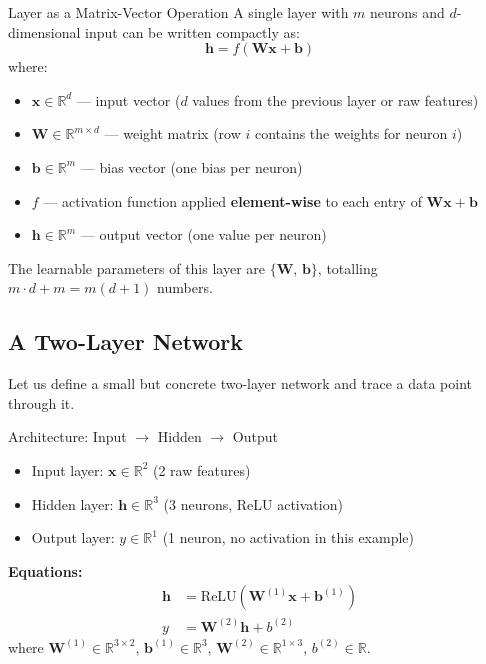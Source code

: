 \begin{conceptbox}{Layer as a Matrix-Vector Operation}
A single layer with $m$ neurons and $d$-dimensional input can be written compactly as:
\begin{equation}
    \mathbf{h} = f\!\left(\mathbf{W}\mathbf{x} + \mathbf{b}\right)
\end{equation}
where:
\begin{itemize}
    \item $\mathbf{x} \in \mathbb{R}^d$ --- input vector ($d$ values from the previous layer or raw features)
    \item $\mathbf{W} \in \mathbb{R}^{m \times d}$ --- weight matrix (row $i$ contains the weights for neuron $i$)
    \item $\mathbf{b} \in \mathbb{R}^m$ --- bias vector (one bias per neuron)
    \item $f$ --- activation function applied \textbf{element-wise} to each entry of $\mathbf{Wx}+\mathbf{b}$
    \item $\mathbf{h} \in \mathbb{R}^m$ --- output vector (one value per neuron)
\end{itemize}
The learnable parameters of this layer are $\{\mathbf{W},\, \mathbf{b}\}$, totalling $m \cdot d + m = m(d+1)$ numbers.
\end{conceptbox}

\subsection{A Two-Layer Network}

Let us define a small but concrete two-layer network and trace a data point through it.

\begin{conceptbox}{Architecture: Input $\to$ Hidden $\to$ Output}
\begin{itemize}
    \item Input layer: $\mathbf{x} \in \mathbb{R}^2$ (2 raw features)
    \item Hidden layer: $\mathbf{h} \in \mathbb{R}^3$ (3 neurons, ReLU activation)
    \item Output layer: $y \in \mathbb{R}^1$ (1 neuron, no activation in this example)
\end{itemize}
\textbf{Equations:}
\begin{align}
    \mathbf{h} &= \text{ReLU}\!\left(\mathbf{W}^{(1)}\mathbf{x} + \mathbf{b}^{(1)}\right) \label{eq:layer1} \\
    y           &= \mathbf{W}^{(2)}\mathbf{h} + b^{(2)} \label{eq:layer2}
\end{align}
where $\mathbf{W}^{(1)} \in \mathbb{R}^{3 \times 2}$, $\mathbf{b}^{(1)} \in \mathbb{R}^{3}$, $\mathbf{W}^{(2)} \in \mathbb{R}^{1 \times 3}$, $b^{(2)} \in \mathbb{R}$.
\end{conceptbox}

